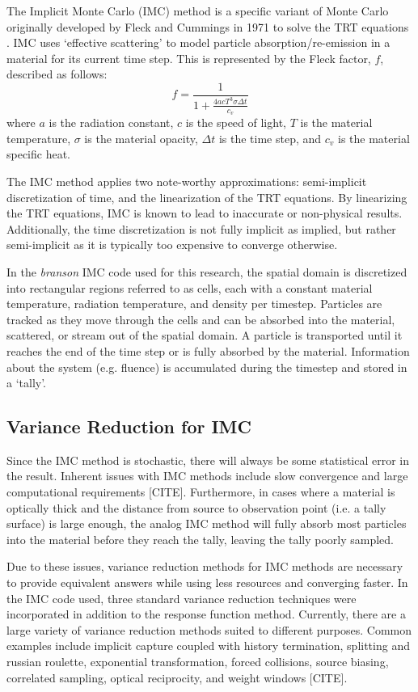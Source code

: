 \documentclass[]{article}
\begin{document}
		The Implicit Monte Carlo (IMC) method is a specific variant of Monte Carlo originally developed by Fleck and Cummings in 1971 to solve the TRT equations \cite{FC71}. IMC uses `effective scattering' to model particle absorption/re-emission in a material for its current time step. This is represented by the Fleck factor, $f$, described as follows:
		\begin{equation}
			f = \frac{1}{1 + \frac{4acT^{3}\sigma \Delta t}{c_{v}}}
		\end{equation}
		where $a$ is the radiation constant, $c$ is the speed of light, $T$ is the material temperature, $\sigma$ is the material opacity, $\Delta t$ is the time step, and $c_{v}$ is the material specific heat.

		The IMC method applies two note-worthy approximations: semi-implicit discretization of time, and the linearization of the TRT equations. By linearizing the TRT equations, IMC is known to lead to inaccurate or non-physical results. Additionally, the time discretization is not fully implicit as implied, but rather semi-implicit as it is typically too expensive to converge otherwise.

    In the \textit{branson} IMC code used for this research, the spatial domain is discretized into rectangular regions referred to as cells, each with a constant material temperature, radiation temperature, and density per timestep. Particles are tracked as they move through the cells and can be absorbed into the material, scattered, or stream out of the spatial domain. A particle is transported until it reaches the end of the time step or is fully absorbed by the material. Information about the system (e.g. fluence) is accumulated during the timestep and stored in a `tally'.


	\subsection{Variance Reduction for IMC}
		Since the IMC method is stochastic, there will always be some statistical error in the result. Inherent issues with IMC methods include slow convergence and large computational requirements [CITE]. Furthermore, in cases where a material is optically thick and the distance from source to observation point (i.e. a tally surface) is large enough, the analog IMC method will fully absorb most particles into the material before they reach the tally, leaving the tally poorly sampled.

		Due to these issues, variance reduction methods for IMC methods are necessary to provide equivalent answers while using less resources and converging faster. In the IMC code used, three standard variance reduction techniques were incorporated in addition to the response function method. Currently, there are a large variety of variance reduction methods suited to different purposes. Common examples include implicit capture coupled with history termination, splitting and russian roulette, exponential transformation, forced collisions, source biasing, correlated sampling, optical reciprocity, and weight windows [CITE].
\end{document}
